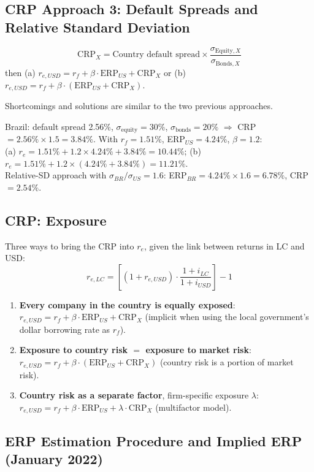 \subsection{CRP Approach 3: Default Spreads and Relative Standard Deviation}
\begin{keybox}
\[
\text{CRP}_X=\text{Country default spread}\times\frac{\sigma_{\text{Equity},X}}{\sigma_{\text{Bonds},X}}
\]
then (a) $r_{e,USD}=r_f+\beta\cdot\text{ERP}_{US}+\text{CRP}_X$ or (b) $r_{e,USD}=r_f+\beta\cdot(\text{ERP}_{US}+\text{CRP}_X)$.
\end{keybox}
Shortcomings and solutions are similar to the two previous approaches.
\begin{exbox}
Brazil: default spread 2.56\%, $\sigma_{\text{equity}}=30\%$, $\sigma_{\text{bonds}}=20\%$ $\Rightarrow$ CRP $=2.56\%\times1.5=3.84\%$. With $r_f=1.51\%$, ERP$_{US}=4.24\%$, $\beta=1.2$:\\
(a) $r_e=1.51\%+1.2\times4.24\%+3.84\%=10.44\%$; \quad (b) $r_e=1.51\%+1.2\times(4.24\%+3.84\%)=11.21\%$.\\
Relative-SD approach with $\sigma_{BR}/\sigma_{US}=1.6$: ERP$_{BR}=4.24\%\times1.6=6.78\%$, CRP $=2.54\%$.
\end{exbox}

\subsection{CRP: Exposure}
Three ways to bring the CRP into $r_e$, given the link between returns in LC and USD:
\[
r_{e,LC}=\left[(1+r_{e,USD})\cdot\frac{1+i_{LC}}{1+i_{USD}}\right]-1
\]
\begin{enumerate}
  \item \textbf{Every company in the country is equally exposed}: $r_{e,USD}=r_f+\beta\cdot\text{ERP}_{US}+\text{CRP}_{X}$ (implicit when using the local government's dollar borrowing rate as $r_f$).
  \item \textbf{Exposure to country risk $=$ exposure to market risk}: $r_{e,USD}=r_f+\beta\cdot(\text{ERP}_{US}+\text{CRP}_{X})$ (country risk is a portion of market risk).
  \item \textbf{Country risk as a separate factor}, firm-specific exposure $\lambda$: $r_{e,USD}=r_f+\beta\cdot\text{ERP}_{US}+\lambda\cdot\text{CRP}_{X}$ (multifactor model).
\end{enumerate}

\subsection{ERP Estimation Procedure and Implied ERP (January 2022)}

